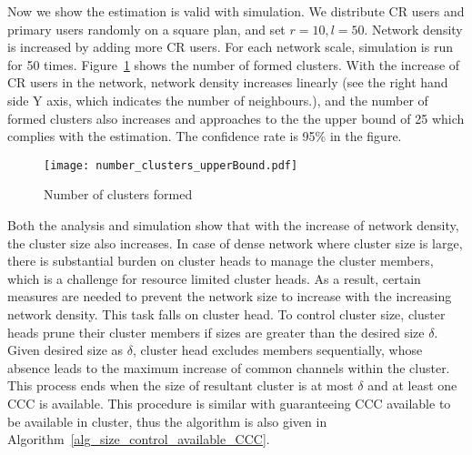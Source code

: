 Now we show the estimation is valid with simulation.
We distribute CR users and primary users randomly on a square plan, and set $r=10, l=50$.
Network density is increased by adding more CR users.
For each network scale, simulation is run for 50 times.
Figure~\ref{number_clusters_scale} shows the number of formed clusters.
With the increase of CR users in the network, network density increases linearly (see the right hand side Y axis, which indicates the number of neighbours.), and the number of formed clusters also increases and approaches to the the upper bound of 25 which complies with the estimation.
The confidence rate is 95\% in the figure.

\begin{figure}[ht!]
  \centering
  \texttt{[image: number\_clusters\_upperBound.pdf]}
  \caption{Number of clusters formed}
  \label{number_clusters_scale}
\end{figure}

Both the analysis and simulation show that with the increase of network density, the cluster size also increases.
In case of dense network where cluster size is large, there is substantial burden on cluster heads to manage the cluster members, which is a challenge for resource limited cluster heads.
As a result, certain measures are needed to prevent the network size to increase with the increasing network density.
This task falls on cluster head.
To control cluster size, cluster heads prune their cluster members if sizes are greater than the desired size $\delta$.
Given desired size as $\delta$, cluster head excludes members sequentially, whose absence leads to the maximum increase of common channels within the cluster.
This process ends when the size of resultant cluster is at most $\delta$ and at least one \gls{CCC} is available.
This procedure is similar with guaranteeing CCC available to be available in cluster, thus the algorithm is also given in Algorithm~\ref{alg_size_control_available_CCC}.


